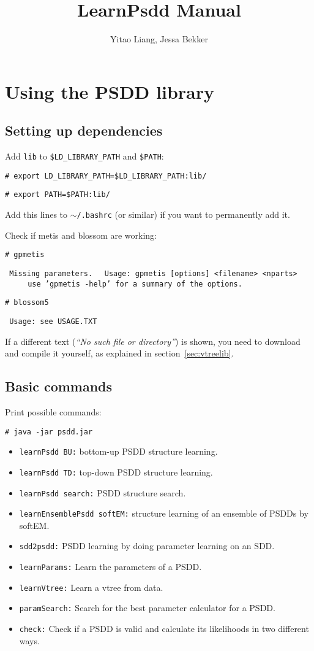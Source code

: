 \documentclass[a4paper,10pt]{article}
\title{LearnPsdd Manual}
\author{Yitao Liang, Jessa Bekker}
\newcommand{\cl}[1]{\begin{framed} #1 \end{framed}}
\newcommand{\code}[1]{\tt\# #1}
\newcommand{\out}[1]{\texttt{ #1}}
\begin{document}
\maketitle


\section{Using the PSDD library}

\subsection{Setting up dependencies}
Add {\tt lib} to {\tt \$LD\_LIBRARY\_PATH} and {\tt \$PATH}:


\cl{
\code{export LD\_LIBRARY\_PATH=\$LD\_LIBRARY\_PATH:lib/}

\code{export PATH=\$PATH:lib/}
}
Add this lines to {\tt $\sim$/.bashrc} (or similar) if you want to permanently add it.

Check if metis and blossom are working:
\cl{

\code{gpmetis}

\out{
Missing parameters.\newline
$~~~~$Usage: gpmetis [options] <filename> <nparts>\newline
$~~~~~~~~~~~~$use 'gpmetis -help' for a summary of the options.
}

\code{blossom5}

\out{
Usage: see USAGE.TXT
}
}

If a different text ({\it ``No such file or directory''}) is shown, you need to download and compile it yourself, as explained in section~\ref{sec:vtreelib}.

\subsection{Basic commands}

Print possible commands:

\cl{
\code{java -jar psdd.jar}
}

\begin{itemize}
 \item {\tt learnPsdd BU:} bottom-up PSDD structure learning.
 \item {\tt learnPsdd TD:} top-down PSDD structure learning.
 \item {\tt learnPsdd search:} PSDD structure search.
 \item {\tt learnEnsemblePsdd softEM:} structure learning of an ensemble of PSDDs by softEM.
 \item {\tt sdd2psdd:} PSDD learning by doing parameter learning on an SDD.
 \item {\tt learnParams:} Learn the parameters of a PSDD.
 \item {\tt learnVtree:} Learn a vtree from data.
 \item {\tt paramSearch:} Search for the best parameter calculator for a PSDD. 
 \item {\tt check:} Check if a PSDD is valid and calculate its likelihoods in two different ways.
\end{itemize}
\end{document}
